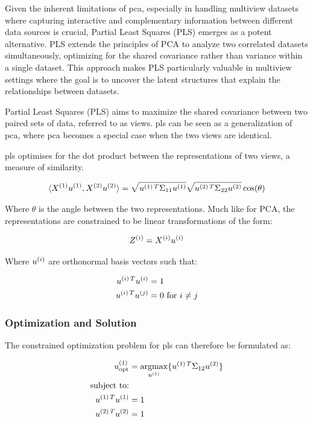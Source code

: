 Given the inherent limitations of \acrshort{pca}, especially in handling multiview datasets where capturing interactive and complementary information between different data sources is crucial, Partial Least Squares (PLS) emerges as a potent alternative. PLS extends the principles of PCA to analyze two correlated datasets simultaneously, optimizing for the shared covariance rather than variance within a single dataset. This approach makes PLS particularly valuable in multiview settings where the goal is to uncover the latent structures that explain the relationships between datasets.

Partial Least Squares (PLS) \citep{wold1975path} aims to maximize the shared covariance between two paired sets of data, referred to as \gls{views}. \acrshort{pls} can be seen as a generalization of \acrshort{pca}, where \acrshort{pca} becomes a special case when the two \gls{views} are identical.

\acrshort{pls} optimises for the dot product between the representations of two views, a measure of similarity.

\begin{align}
    \label{eq:dot-product}
    \langle X^{(1)}u^{(1)}, X^{(2)}u^{(2)}\rangle =\sqrt{u^{(1)\,T}\Sigma_{11}u^{(1)}} \sqrt{u^{(2)\,T}\Sigma_{22}u^{(2)}} \cos(\theta)
\end{align}

Where $\theta$ is the angle between the two representations.
Much like for PCA, the representations are constrained to be linear transformations of the form:

\begin{align}
    Z^{(i)} = X^{(i)} u^{(i)}
\end{align}

Where $u^{(i)}$ are orthonormal basis vectors such that:

\begin{align}
    u^{(i)\,T}u^{(i)} & = 1 \\
    u^{(i)\,T}u^{(j)} & = 0 \text{ for } i \neq j
\end{align}

\subsubsection{Optimization and Solution}

The constrained optimization problem for \acrshort{pls} can therefore be formulated as:

\begin{align}
    u^{(1)}_{\text{opt}} & = \underset{u^{(1)}}{\mathrm{argmax}} \{ u^{(1)\,T} \Sigma_{12} u^{(2)} \} \\
    \text{subject to:} \notag                                                                             \\
    u^{(1)\,T}u^{(1)}   & = 1 \notag                                                                    \\
    u^{(2)\,T}u^{(2)}   & = 1 \notag
\end{align}

